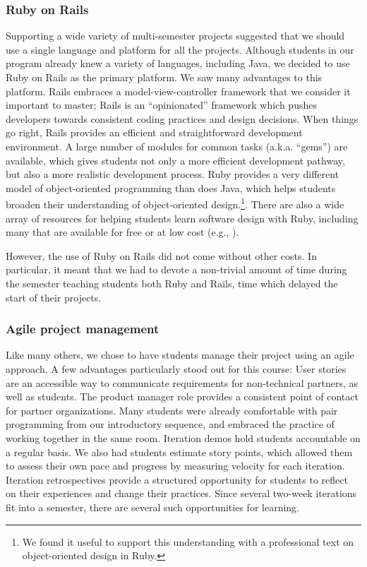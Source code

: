 
\subsubsection{Ruby on Rails}

Supporting a wide variety of multi-semester projects suggested that
we should use a single language and platform for all the
projects.
Although students in our program already knew
a variety of languages, including Java, we decided to use Ruby on
Rails as the primary platform.  We saw many advantages to this
platform. Rails embraces a model-view-controller framework that we
consider it important to master; Rails is an ``opinionated'' framework
which pushes developers towards consistent coding practices and
design decisions.  When things go right, Rails provides an efficient
and straightforward development environment.  A large number of
modules for common tasks (a.k.a. ``gems'') are available, which
gives students not only a more efficient development pathway, but
also a more realistic development process. Ruby provides a very
different model of object-oriented programming than does Java, which
helps students broaden their understanding of object-oriented
design.\footnote{We found it useful to support this understanding
with a professional text on object-oriented design in Ruby.\cite{poodr}}.
There are also a wide array of resources for helping students
learn software design with Ruby, including many that are available
for free or at low cost (e.g., \cite{saasbook,rails-tutorial}).

However, the use of Ruby on Rails did not come without other costs.  In
particular, it meant that we had to devote a non-trivial amount of
time during the semester teaching students both Ruby and Rails, time
which delayed the start of their projects.

\subsubsection{Agile project management}

Like many others, we chose to have students manage their project using an 
agile approach.  A few advantages particularly stood out
for this course: User stories are an accessible way to communicate
requirements for non-technical partners, as well as students. 
The product manager role provides a consistent point of contact for partner 
organizations.
Many students were already comfortable with pair programming from our 
introductory sequence, and embraced the 
practice of working together in the same room.
Iteration demos hold students accountable on a regular basis.  
We also had students estimate story points, which allowed them to assess 
their own pace and progress by measuring velocity for each iteration.
Iteration retrospectives provide a structured opportunity for students 
to reflect on their experiences and change their practices.  
Since several two-week iterations fit into a 
semester, there are several such opportunities for learning.

